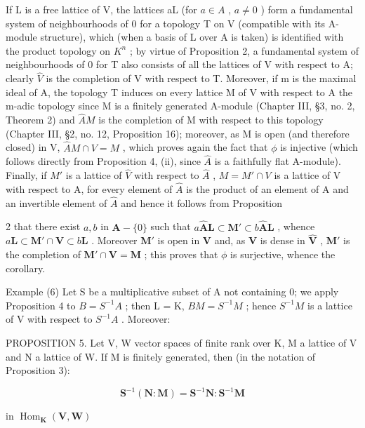 If L is a free lattice of V, the lattices aL (for \(a \in A\) , \(a \neq 0\) ) form a fundamental system of neighbourhoods of 0 for a topology T on V (compatible with its A-module structure), which (when a basis of L over A is taken) is identified with the product topology on \(K^{n}\) ; by virtue of Proposition 2, a fundamental system of neighbourhoods of 0 for T also consists of all the lattices of V with respect to A; clearly \(\hat{V}\) is the completion of V with respect to T. Moreover, if m is the maximal ideal of A, the topology T induces on every lattice M of V with respect to A the m-adic topology since M is a finitely generated A-module (Chapter III, §3, no. 2, Theorem 2) and \(\hat{A}M\) is the completion of M with respect to this topology (Chapter III, §2, no. 12, Proposition 16); moreover, as M is open (and therefore closed) in V, \(\hat{A}M \cap V = M\) , which proves again the fact that \(\phi\) is injective (which follows directly from Proposition 4, (ii), since \(\hat{A}\) is a faithfully flat A-module). Finally, if \(M'\) is a lattice of \(\hat{V}\) with respect to \(\hat{A}\) , \(M = M' \cap V\) is a lattice of V with respect to A, for every element of \(\hat{A}\) is the product of an element of A and an invertible element of \(\hat{A}\) and hence it follows from Proposition

2 that there exist \(a, b\) in \(\mathbf{A} - \{0\}\) such that \(a\hat{\mathbf{A}}\mathbf{L} \subset \mathbf{M}' \subset b\hat{\mathbf{A}}\mathbf{L}\) , whence \(a\mathbf{L} \subset \mathbf{M}' \cap \mathbf{V} \subset b\mathbf{L}\) . Moreover \(\mathbf{M}'\) is open in \(\mathbf{V}\) and, as \(\mathbf{V}\) is dense in \(\hat{\mathbf{V}}\) , \(\mathbf{M}'\) is the completion of \(\mathbf{M}' \cap \mathbf{V} = \mathbf{M}\) ; this proves that \(\phi\) is surjective, whence the corollary.

Example (6) Let S be a multiplicative subset of A not containing 0; we apply Proposition 4 to \(B = S^{-1}A\) ; then L = K, \(BM = S^{-1}M\) ; hence \(S^{-1}M\) is a lattice of V with respect to \(S^{-1}A\) . Moreover:

PROPOSITION 5. Let V, W vector spaces of finite rank over K, M a lattice of V and N a lattice of W. If M is finitely generated, then (in the notation of Proposition 3):

\[
\mathbf {S} ^ {- 1} (\mathbf {N}: \mathbf {M}) = \mathbf {S} ^ {- 1} \mathbf {N}: \mathbf {S} ^ {- 1} \mathbf {M}\tag{1}
\]

in \(\operatorname{Hom}_{\mathbf{K}}(\mathbf{V},\mathbf{W})\)

